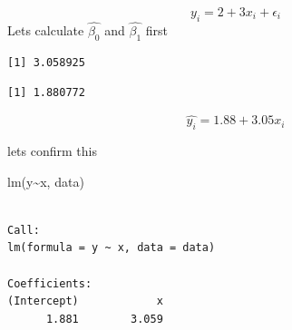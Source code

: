 \documentclass[
  letterpaper,
  DIV=11,
  numbers=noendperiod]{scrreprt}
\newenvironment{Shaded}{\begin{snugshade}}{\end{snugshade}}
\newcommand{\DecValTok}[1]{\textcolor[rgb]{0.47,0.16,0.63}{#1}}
\newcommand{\FunctionTok}[1]{\textcolor[rgb]{0.02,0.16,0.49}{#1}}
\newcommand{\NormalTok}[1]{\textcolor[rgb]{0.33,0.33,0.33}{#1}}
\newcommand{\OtherTok}[1]{\textcolor[rgb]{0.85,0.12,0.09}{#1}}
\newcommand{\SpecialCharTok}[1]{\textcolor[rgb]{0.00,0.46,0.62}{#1}}
\begin{document}
\[
y_i = 2 + 3 x_i + \epsilon_i
\] Lets calculate \(\hat{\beta_0}\) and \(\hat{\beta_1}\) first

\begin{Shaded}
\end{Shaded}

\begin{verbatim}
[1] 3.058925
\end{verbatim}

\begin{Shaded}
\end{Shaded}

\begin{verbatim}
[1] 1.880772
\end{verbatim}

\[
\hat{y_i} = 1.88 + 3.05 x_i
\]

lets confirm this

\begin{Shaded}
\begin{Highlighting}[]
\FunctionTok{lm}\NormalTok{(y}\SpecialCharTok{\textasciitilde{}}\NormalTok{x, data)}
\end{Highlighting}
\end{Shaded}

\begin{verbatim}

Call:
lm(formula = y ~ x, data = data)

Coefficients:
(Intercept)            x  
      1.881        3.059  
\end{verbatim}
\end{document}
